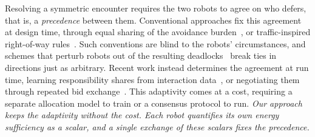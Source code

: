 Resolving a symmetric encounter requires the two robots to agree on who defers, that is, a \emph{precedence} between them.
Conventional approaches fix this agreement at design time, through equal sharing of the avoidance burden~\cite{wang2017safety}, or traffic-inspired right-of-way rules~\cite{celi2019deconfliction}.
Such conventions are blind to the robots' circumstances, and schemes that perturb robots out of the resulting deadlocks~\cite{grover2023before, chandra2025deadlock} break ties in directions just as arbitrary.
Recent work instead determines the agreement at run time, learning responsibility shares from interaction data~\cite{cosner2023learning, remy2025learning}, or negotiating them through repeated bid exchange~\cite{autenrieb2025auction}.
This adaptivity comes at a cost, requiring a separate allocation model to train or a consensus protocol to run.
\textit{Our approach keeps the adaptivity without the cost. Each robot quantifies its own energy sufficiency as a scalar, and a single exchange of these scalars fixes the precedence.}